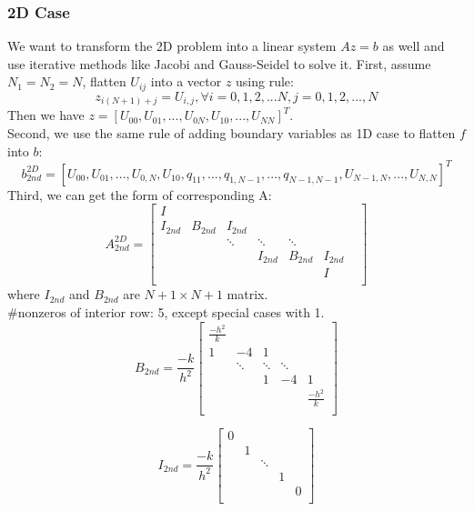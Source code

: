 \documentclass[a4paper]{article}
\begin{document}
\subsubsection{2D Case}
We want to transform the 2D problem into a linear system $Az=b$ as well and use iterative methods like Jacobi and Gauss-Seidel to solve it.
First, assume $N_1=N_2=N$, flatten $U_{ij}$ into a vector $z$ using rule: 
$$z_{i(N+1)+j} = U_{i,j}, \forall i = 0,1,2,...N, j = 0,1,2,...,N$$
Then we have $z = [U_{00}, U_{01},...,U_{0N},U_{10},...,U_{NN}]^T$.  \\
Second, we use the same rule of adding boundary variables as 1D case to flatten $f$ into $b$:
$$b_{2nd}^{2D} = [U_{00}, U_{01},..., U_{0,N}, U_{10}, q_{11},...,q_{1,N-1},...,q_{N-1,N-1},U_{N-1,N},...,U_{N,N} ]^T $$
Third, we can get the form of corresponding A:
\[
A_{2nd}^{2D}
= 
\begin{bmatrix}
     I &  &   &   &  &\\
    I_{2nd} & B_{2nd} & I_{2nd}  &   &  &\\
     & & \ddots & \ddots & \ddots & & \\
     & & & I_{2nd}& B_{2nd}  & I_{2nd}& \\
     & & &  &  &  I  \\
\end{bmatrix}
\]
where $I_{2nd}$ and $B_{2nd}$ are $N+1 \times N+1$ matrix.\\
\#nonzeros of interior row: 5, except special cases with 1. 
\[
B_{2nd} = \frac{-k}{h^2}
\begin{bmatrix}
    \frac{-h^2}{k}\\
    1 & -4 & 1  &     \\
    
     & \ddots & \ddots & \ddots  \\
     &  & 1 & -4  &1 \\
     &  &   & & \frac{-h^2}{k}\\
\end{bmatrix}
\]

\[
I_{2nd} = \frac{-k}{h^2}
\begin{bmatrix}
    0\\
      &1&  &   &     \\
    
     & & \ddots  \\
     &  &  &1 \\
     &  &   & & 0\\
\end{bmatrix}
\]
\end{document}
